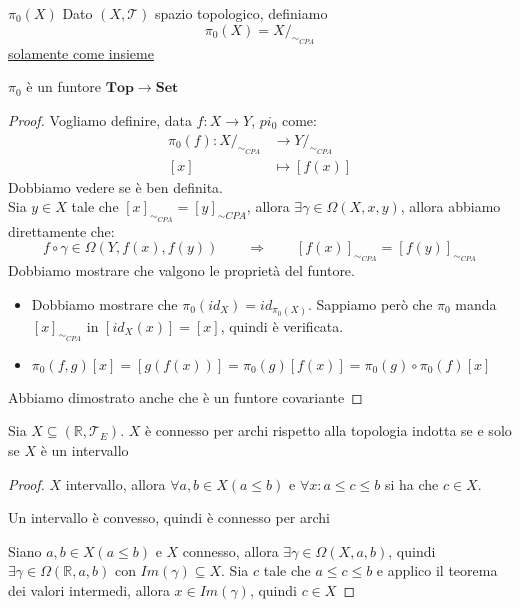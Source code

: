 \documentclass[11pt,a4paper,twoside]{article}
\theoremstyle{definition}
\begin{document}
\begin{defn}{$\pi_0(X)$}{}
	Dato $(X, \mathcal T)$ spazio topologico, definiamo
	\[\pi_0(X) = X/_{\sim_{CPA}}\]
	\underline{solamente come insieme}
\end{defn}

\begin{prop}{}{}
	$\pi_0$ è un funtore $\bm{Top} \to \bm{Set}$
\end{prop}
\begin{proof}
	Vogliamo definire, data $f:X \to Y$, $pi_0$ come:
	\begin{align*}
		\pi_0(f): X/_{\sim_{CPA}} & \to Y/_{\sim_{CPA}}\\
		[x] & \mapsto [f(x)]
	\end{align*}
	Dobbiamo vedere se è ben definita.\\
	Sia $y \in X$ tale che $[x]_{\sim_{CPA}} = [y]_{\sim{CPA}}$, allora $\exists \gamma \in \Omega(X, x, y)$, allora abbiamo direttamente che:
	\[ f \circ \gamma \in \Omega(Y, f(x), f(y))\qquad \Rightarrow \qquad [f(x)]_{\sim_{CPA}} = [f(y)]_{\sim_{CPA}}\]
	Dobbiamo mostrare che valgono le proprietà del funtore.
	\begin{itemize}
		\item Dobbiamo mostrare che $\pi_0(id_X) = id_{\pi_0(X)}$. Sappiamo però che $\pi_0$ manda $[x]_{\sim_{CPA}}$ in $[id_X(x)] $$= [x]$, quindi è verificata.
		\item $\pi_0(f,g)[x] = [g(f(x))] = \pi_0(g)[f(x)]= \pi_0(g) \circ \pi_0(f)[x]$
	\end{itemize}
	Abbiamo dimostrato anche che è un funtore covariante
\end{proof}

\begin{prop}{}{}
	Sia $X\subseteq(\mathbb R, \mathcal T_E)$. $X$ è connesso per archi rispetto alla topologia indotta se e solo se $X$ è un intervallo
\end{prop}
\begin{proof}
	$X$ intervallo, allora $\forall a,b \in X (a \leq b)$ e $\forall x: a \leq c \leq b$ si ha che $c \in X$.

	\fbox{$\Leftarrow$} Un intervallo è convesso, quindi è connesso per archi

	\fbox{$\Rightarrow$} Siano $a,b \in X (a \leq b)$ e $X$ connesso, allora $\exists \gamma \in \Omega(X, a,b)$, quindi $\exists \gamma \in \Omega(\mathbb R, a, b)$ con $Im(\gamma) \subseteq X$. Sia $c$ tale che $a \leq c\leq b$ e applico il teorema dei valori intermedi, allora $x \in Im(\gamma)$, quindi $c \in X$
\end{proof}
\end{document}
